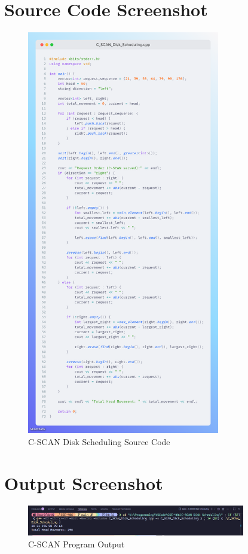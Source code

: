 \documentclass[12pt,a4paper]{article}
\begin{document}
\section{Source Code Screenshot}
\begin{figure}[H]
  \centering
  \includegraphics[width=0.75\textwidth]{Code.png}
  \caption{C-SCAN Disk Scheduling Source Code}
\end{figure}

\section{Output Screenshot}
\begin{figure}[H]
  \centering
  \includegraphics[width=0.85\textwidth]{Screenshot 2025-10-03 203253.png}
  \caption{C-SCAN Program Output}
\end{figure}
\end{document}
